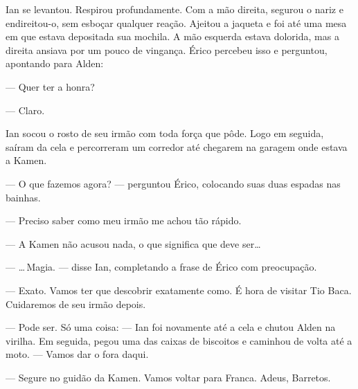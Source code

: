 Ian se levantou. Respirou profundamente. Com a mão direita, segurou o nariz e
endireitou-o, sem esboçar qualquer reação. Ajeitou a jaqueta e foi até uma mesa
em que estava depositada sua mochila. A mão esquerda estava dolorida, mas a
direita ansiava por um pouco de vingança. Érico percebeu isso e perguntou,
apontando para Alden:

--- Quer ter a honra?

--- Claro.

Ian socou o rosto de seu irmão com toda força que pôde. Logo em seguida, saíram
da cela e percorreram um corredor até chegarem na garagem onde estava a Kamen.

--- O que fazemos agora? --- perguntou Érico, colocando suas duas espadas nas
bainhas.

--- Preciso saber como meu irmão me achou tão rápido.

--- A Kamen não acusou nada, o que significa que deve ser\ldots

--- \ldots\,Magia. --- disse Ian, completando a frase de Érico com preocupação.

--- Exato. Vamos ter que descobrir exatamente como. É hora de visitar Tio Baca.
Cuidaremos de seu irmão depois.

--- Pode ser. Só uma coisa: --- Ian foi novamente até a cela e chutou Alden na
virilha. Em seguida, pegou uma das caixas de biscoitos e caminhou de volta até
a moto. --- Vamos dar o fora daqui.

--- Segure no guidão da Kamen. Vamos voltar para Franca. Adeus, Barretos.
